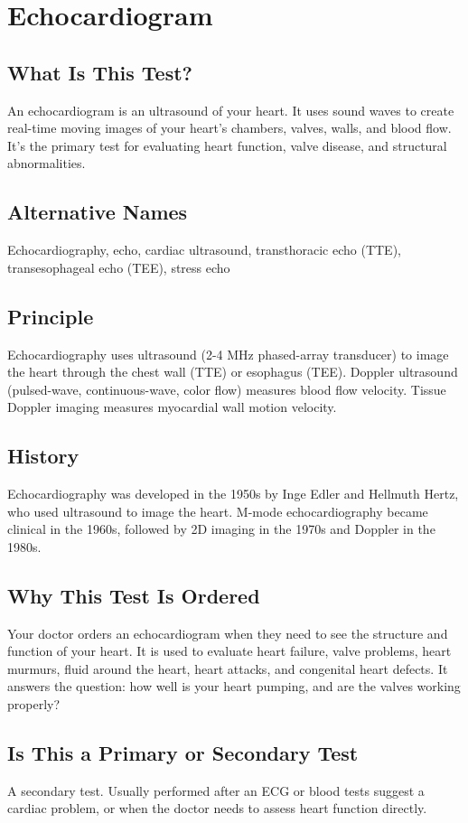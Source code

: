 \chapter{Echocardiogram}

\section*{What Is This Test?}
An echocardiogram is an ultrasound of your heart. It uses sound waves to create real-time moving images of your heart's chambers, valves, walls, and blood flow. It's the primary test for evaluating heart function, valve disease, and structural abnormalities.

\section*{Alternative Names}
Echocardiography, echo, cardiac ultrasound, transthoracic echo (TTE), transesophageal echo (TEE), stress echo


\section*{Principle}
Echocardiography uses ultrasound (2-4 MHz phased-array transducer) to image the heart through the chest wall (TTE) or esophagus (TEE). Doppler ultrasound (pulsed-wave, continuous-wave, color flow) measures blood flow velocity. Tissue Doppler imaging measures myocardial wall motion velocity.

\section*{History}
Echocardiography was developed in the 1950s by Inge Edler and Hellmuth Hertz, who used ultrasound to image the heart. M-mode echocardiography became clinical in the 1960s, followed by 2D imaging in the 1970s and Doppler in the 1980s.

\section*{Why This Test Is Ordered}
Your doctor orders an echocardiogram when they need to see the structure and function of your heart. It is used to evaluate heart failure, valve problems, heart murmurs, fluid around the heart, heart attacks, and congenital heart defects. It answers the question: how well is your heart pumping, and are the valves working properly?

\section*{Is This a Primary or Secondary Test}
A secondary test. Usually performed after an ECG or blood tests suggest a cardiac problem, or when the doctor needs to assess heart function directly.

